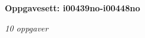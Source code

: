 \centerline{\bf Oppgavesett: i00439no-i00448no}
\vskip 10pt
\centerline{\it 10 oppgaver}\vskip 10pt
\vskip 10pt
